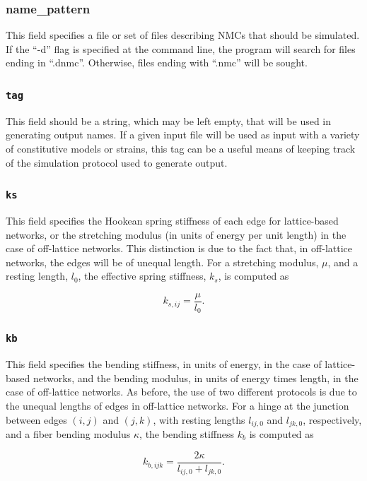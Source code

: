 \documentclass{article}
\begin{document}
\subsubsection*{name\_pattern}
This field specifies a file or set of files describing NMCs that should be
simulated. If the ``-d'' flag is specified at the command line, the program
will search for files ending in ``.dnmc''. Otherwise, files ending with
``.nmc'' will be sought.

\subsubsection*{\texttt{tag}}
This field should be a string, which may be left empty, that will be used
in generating output names. If a given input file will be used as input with
a variety of constitutive models or strains, this tag can be a useful means
of keeping track of the simulation protocol used to generate output.

\subsubsection*{\texttt{ks}}
This field specifies the Hookean spring stiffness of each edge for lattice-based
networks, or the stretching modulus (in units of energy per unit length) in the
case of off-lattice networks. This distinction is due to the fact that, in
off-lattice networks, the edges will be of unequal length. For a stretching
modulus, $\mu$, and a resting length, $l_0$, the effective spring stiffness,
$k_s$, is computed as

\begin{equation}
k_{s, ij} = \frac{\mu}{l_0}.
\end{equation}

\subsubsection*{\texttt{kb}}
This field specifies the bending stiffness, in units of energy, in the case of
lattice-based networks, and the bending modulus, in units of energy times
length, in the case of off-lattice networks. As before, the use of two different
protocols is due to the unequal lengths of edges in off-lattice networks. For
a hinge at the junction between edges $(i, j)$ and $(j, k)$, with resting
lengths $l_{ij,0}$ and $l_{jk,0}$, respectively, and a fiber bending modulus
$\kappa$, the bending stiffness $k_b$ is computed as

\begin{equation}
k_{b, ijk} = \frac{2 \kappa}{l_{ij, 0} + l_{jk, 0}}.
\end{equation}
\end{document}
